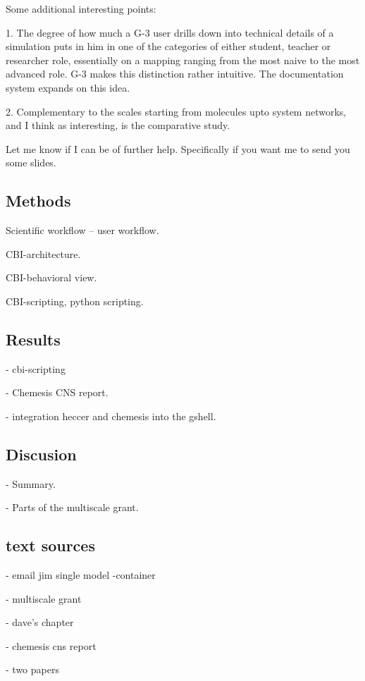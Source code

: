 \documentclass[12pt]{article}
\begin{document}
Some additional interesting points:

1. The degree of how much a G-3 user drills down into technical
details of a simulation puts in him in one of the categories of either
student, teacher or researcher role, essentially on a mapping ranging
from the most naive to the most advanced role.  G-3 makes this
distinction rather intuitive.  The documentation system expands on
this idea.

2. Complementary to the scales starting from molecules upto system
networks, and I think as interesting, is the comparative study.

Let me know if I can be of further help.  Specifically if you want me
to send you some slides.

\subsection*{Methods}

Scientific workflow -- user workflow.

CBI-architecture.

CBI-behavioral view.

CBI-scripting, python scripting.


\subsection*{Results}

- cbi-scripting

- Chemesis CNS report.

- integration heccer and chemesis into the gshell.


\subsection*{Discusion}

- Summary.

- Parts of the multiscale grant.


\subsection*{text sources}

- email jim single model -container

- multiscale grant

- dave's chapter

- chemesis cns report

- two papers
\end{document}
